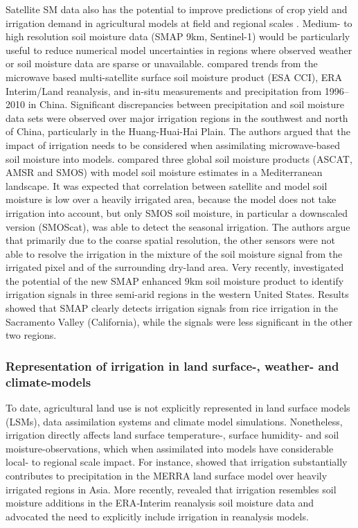 \documentclass[hess, manuscript]{copernicus}
\begin{document}
Satellite SM data also has the potential to improve predictions of crop yield and irrigation demand in agricultural models at field and regional scales \citep{ElSharif2015}. Medium- to high resolution soil moisture data (SMAP 9km, Sentinel-1) would be particularly useful to reduce numerical model uncertainties in regions where observed weather or soil moisture data are sparse or unavailable. \citet{Qiu2016} compared trends from the microwave based
multi-satellite surface soil moisture product (ESA CCI), ERA Interim/Land
reanalysis, and in-situ measurements and precipitation from 1996–2010 in China. Significant discrepancies between precipitation and soil moisture data sets were observed over major irrigation regions in the southwest and north of China, particularly in the Huang-Huai-Hai Plain. The authors argued that the impact of irrigation needs to be considered when assimilating microwave-based soil moisture into models. \citet{escorihuela2016comparison} compared three global soil moisture products (ASCAT, AMSR and SMOS) with model soil moisture estimates in a Mediterranean landscape. It was expected that correlation between satellite and model soil moisture is low over a heavily irrigated area, because the model does not take irrigation into account, but only SMOS soil moisture, in particular a downscaled version (SMOScat), was able to detect the seasonal irrigation. The authors argue that primarily due to the coarse spatial resolution, the other sensors were not able to resolve the irrigation in the mixture of the soil moisture signal from the irrigated pixel and of the surrounding dry-land area. Very recently, \citet{Lawston2017} investigated the potential of the new SMAP enhanced 9km soil moisture product to identify irrigation signals in three semi-arid regions in the western United States. Results showed that SMAP clearly detects irrigation signals from rice irrigation in the Sacramento Valley (California), while the signals were less significant in the other two regions.

\subsubsection{Representation of irrigation in land surface-, weather- and climate-models}
To date, agricultural land use is not explicitly represented in land surface models (LSMs), data assimilation systems and climate model simulations. Nonetheless, irrigation directly affects land surface temperature-, surface humidity- and soil moisture-observations, which when assimilated into models have considerable local- to regional scale impact. For instance, \citet{Wei_2013} showed that irrigation substantially contributes to precipitation in the MERRA land surface model over heavily irrigated regions in Asia. More recently, \citet{Tuinenburg2017} revealed that irrigation resembles soil moisture additions in the ERA‐Interim reanalysis soil moisture data and advocated the need to explicitly include irrigation in reanalysis models.\\ 
\end{document}
